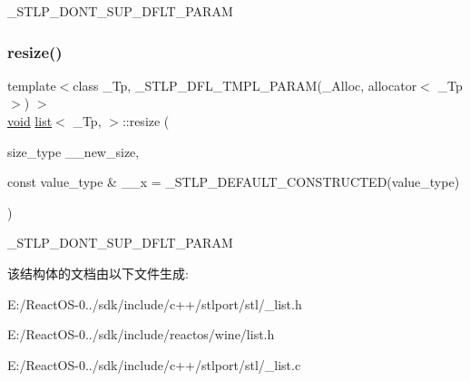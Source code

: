 \+\_\+\+S\+T\+L\+P\+\_\+\+D\+O\+N\+T\+\_\+\+S\+U\+P\+\_\+\+D\+F\+L\+T\+\_\+\+P\+A\+R\+AM \mbox{\label{classlist_a5d5ac3f8ac555592b578e70a2f47d7b4}} 
\subsubsection{\texorpdfstring{resize()}{resize()}}
{\footnotesize\ttfamily template$<$class \+\_\+\+Tp, \+\_\+\+S\+T\+L\+P\+\_\+\+D\+F\+L\+\_\+\+T\+M\+P\+L\+\_\+\+P\+A\+R\+A\+M(\+\_\+\+Alloc, allocator$<$ \+\_\+\+Tp $>$) $>$ \\
\hyperlink{interfacevoid}{void} \hyperlink{classlist}{list}$<$ \+\_\+\+Tp, $>$\+::resize (\begin{DoxyParamCaption}\item[{size\+\_\+type}]{\+\_\+\+\_\+new\+\_\+size,  }\item[{const value\+\_\+type \&}]{\+\_\+\+\_\+x = {\ttfamily \+\_\+STLP\+\_\+DEFAULT\+\_\+CONSTRUCTED(value\+\_\+type)} }\end{DoxyParamCaption})\hspace{0.3cm}{\ttfamily [inline]}}

\+\_\+\+S\+T\+L\+P\+\_\+\+D\+O\+N\+T\+\_\+\+S\+U\+P\+\_\+\+D\+F\+L\+T\+\_\+\+P\+A\+R\+AM 

该结构体的文档由以下文件生成\+:\begin{DoxyCompactItemize}
\item 
E\+:/\+React\+O\+S-\/0../sdk/include/c++/stlport/stl/\+\_\+list.\+h\item 
E\+:/\+React\+O\+S-\/0../sdk/include/reactos/wine/list.\+h\item 
E\+:/\+React\+O\+S-\/0../sdk/include/c++/stlport/stl/\+\_\+list.\+c\end{DoxyCompactItemize}
